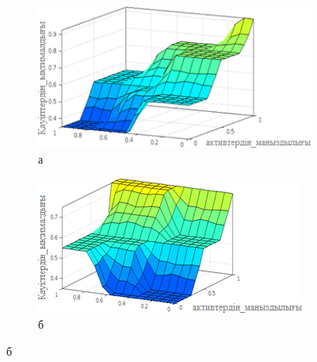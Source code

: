 \begin{figure}[H]
    \centering
    \begin{subfigure}{0.45\textwidth}
        \centering
        \includegraphics[width=\linewidth]{media/ict/image27}
        \caption*{а}
    \end{subfigure}
    \hfill
    \begin{subfigure}{0.45\textwidth}
        \centering
        \includegraphics[width=\linewidth]{media/ict/image28}
        \caption*{б}
    \end{subfigure}
\end{figure}

